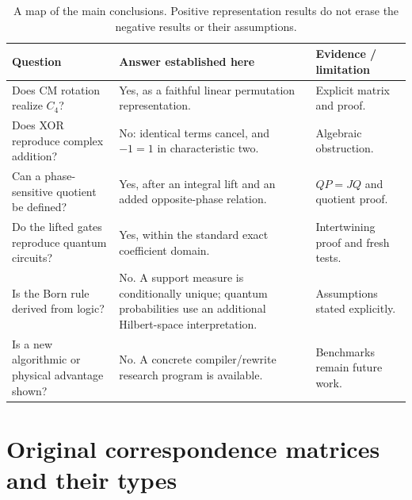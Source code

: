\begin{table}[htbp]
\centering\small
\begin{tabularx}{\textwidth}{@{}L{0.25\textwidth}Y L{0.23\textwidth}@{}}
\toprule
Question & Answer established here & Evidence / limitation\\
\midrule
Does CM rotation realize $C_4$? & Yes, as a faithful linear permutation representation. & Explicit matrix and proof.\\
Does XOR reproduce complex addition? & No: identical terms cancel, and $-1=1$ in characteristic two. & Algebraic obstruction.\\
Can a phase-sensitive quotient be defined? & Yes, after an integral lift and an added opposite-phase relation. & $QP=JQ$ and quotient proof.\\
Do the lifted gates reproduce quantum circuits? & Yes, within the standard exact coefficient domain. & Intertwining proof and fresh tests.\\
Is the Born rule derived from logic? & No. A support measure is conditionally unique; quantum probabilities use an additional Hilbert-space interpretation. & Assumptions stated explicitly.\\
Is a new algorithmic or physical advantage shown? & No. A concrete compiler/rewrite research program is available. & Benchmarks remain future work.\\
\bottomrule
\end{tabularx}
\caption{A map of the main conclusions. Positive representation results do not erase the negative results or their assumptions.}
\end{table}

\section{Original correspondence matrices and their types}\label{sec:foundations}
